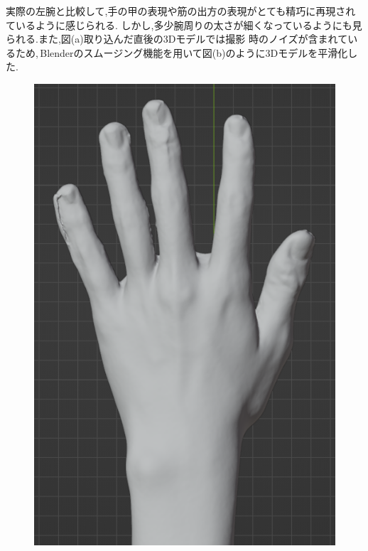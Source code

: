 \documentclass{ltjsreport}
\begin{document}
		\vspace{-15pt}

		実際の左腕と比較して,手の甲の表現や筋の出方の表現がとても精巧に再現されているように感じられる.
		しかし,多少腕周りの太さが細くなっているようにも見られる.また,図(a)取り込んだ直後の3Dモデルでは撮影
		時のノイズが含まれているため,\,Blenderのスムージング機能を用いて図(b)のように3Dモデルを平滑化した.

		\begin{figure}[H]
		\centering
		\begin{minipage}{0.3\columnwidth}
		\centering
		\includegraphics[width = \columnwidth]{../figs/SmoothingBeforRear.png}
		\label{fig:smoothingbefor}
		\end{minipage}

\end{figure}
\end{document}
